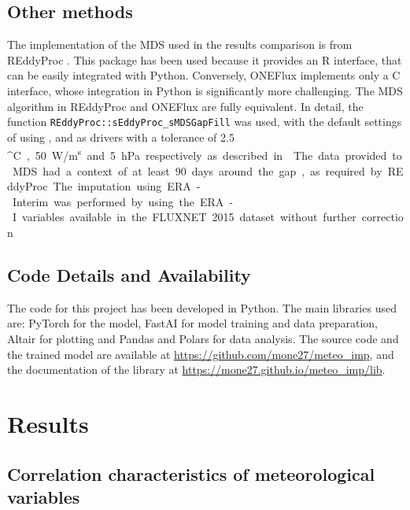\documentclass{article}
\let\Oldsection\section
\renewcommand{\section}{\FloatBarrier\Oldsection}
\let\Oldsubsection\subsection
\renewcommand{\subsection}{\FloatBarrier\Oldsubsection}
\begin{document}
\subsection{Other methods}

The implementation of the MDS used in the results comparison is from \textsf{REddyProc} \cite{wutzler_basic_2018}. This package has been used because it provides an R interface, that can be easily integrated with Python. Conversely, \textsf{ONEFlux} implements only a C interface, whose integration in Python is significantly more challenging.  The MDS algorithm in \textsf{REddyProc} and \textsf{ONEFlux} are fully equivalent. In detail, the function \verb|REddyProc::sEddyProc_sMDSGapFill| was used, with the default settings of using ,  and  as drivers with a tolerance of 2.5 \si{^\circ C}, 50 \si{W/m^s} and 5 \si{hPa} respectively as described in \textcite{reichstein_separation_2005-3}.
The data provided to MDS had a context of at least 90 days around the gap, as required by \textsf{REddyProc}.

The imputation using ERA-Interim was performed by using the ERA-I variables available in the FLUXNET 2015 dataset without further correction.

\subsection{Code Details and Availability}

The code for this project has been developed in Python. The main libraries used are: \textsf{PyTorch} \cite{NEURIPS2019_9015} for the model,  \textsf{FastAI} \cite{howard_fastai_2020} for model training and data preparation, \textsf{Altair} \cite{VanderPlas2018,Satyanarayan2017} for plotting and \textsf{Pandas} and \textsf{Polars} for data analysis. The source code and the trained model are available at \url{https://github.com/mone27/meteo_imp}, and the documentation of the library at \url{https://mone27.github.io/meteo_imp/lib}.

\section{Results}

\subsection{Correlation characteristics of meteorological variables}
\end{document}

